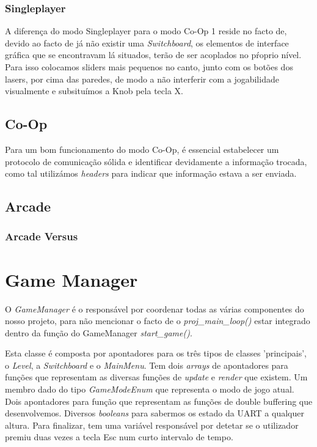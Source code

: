 \documentclass{report}
\begin{document}
\subsubsection{Singleplayer}

A diferença do modo Singleplayer para o modo Co-Op 1 reside no facto de, devido ao facto de já não existir uma \textit{Switchboard}, os elementos de interface gráfica que se encontravam lá situados, terão de ser acoplados no pŕoprio nível. Para isso colocamos sliders mais pequenos no canto, junto com os botões dos lasers, por cima das paredes, de modo a não interferir com a jogabilidade visualmente e subsituímos a Knob pela tecla X.

\subsection{Co-Op}
Para um bom funcionamento do modo Co-Op, é essencial estabelecer um protocolo de comunicação sólida e identificar devidamente a informação trocada, como tal utilizámos \textit{headers} para indicar que informação estava a ser enviada.

\subsection{Arcade}

\subsubsection{Arcade Versus}

\section{Game Manager}

O \textit{GameManager} é o responsável por coordenar todas as várias componentes do nosso projeto, para não mencionar o facto de o \textit{proj\_main\_loop()} estar integrado dentro da função do GameManager \textit{start\_game()}.

Esta classe é composta por apontadores para os três tipos de classes 'principais', o \textit{Level}, a \textit{Switchboard} e o \textit{MainMenu}. Tem dois \textit{arrays} de apontadores para funções que representam as diversas funções de \textit{update} e \textit{render} que existem. Um membro dado do tipo \textit{GameModeEnum} que representa o modo de jogo atual. Dois apontadores para função que representam as funções de double buffering que desenvolvemos. Diversos \textit{booleans} para sabermos os estado da UART a qualquer altura. Para finalizar, tem uma variável responsável por detetar se o utilizador premiu duas vezes a tecla Esc num curto intervalo de tempo.
\end{document}
